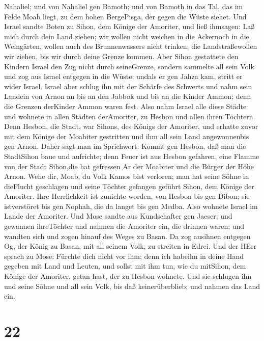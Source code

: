 Nahaliel; und von Nahaliel gen Bamoth;  und von Bamoth in
das Tal, das im Felde Moab liegt, zu dem hohen BergePisga, der gegen die
Wüste siehet.  Und Israel sandte Boten zu Sihon, dem Könige
der Amoriter, und ließ ihmsagen:  Laß mich durch dein Land
ziehen; wir wollen nicht weichen in die Ackernoch in die Weingärten,
wollen auch des Brunnenwassers nicht trinken; die Landstraßewollen wir
ziehen, bis wir durch deine Grenze kommen.  Aber Sihon
gestattete den Kindern Israel den Zug nicht durch seineGrenze, sondern
sammelte all sein Volk und zog aus Israel entgegen in die Wüste; undals
er gen Jahza kam, stritt er wider Israel.  Israel aber
schlug ihn mit der Schärfe des Schwerts und nahm sein Landein von Arnon
an bis an den Jabbok und bis an die Kinder Ammon; denn die Grenzen
derKinder Ammon waren fest.  Also nahm Israel alle diese
Städte und wohnete in allen Städten derAmoriter, zu Hesbon und allen
ihren Töchtern.  Denn Hesbon, die Stadt, war Sihons, des
Königs der Amoriter, und erhatte zuvor mit dem Könige der Moabiter
gestritten und ihm all sein Land angewonnenbis gen Arnon. 
Daher sagt man im Sprichwort: Kommt gen Hesbon, daß man die StadtSihon
baue und aufrichte;  denn Feuer ist aus Hesbon gefahren,
eine Flamme von der Stadt Sihon,die hat gefressen Ar der Moabiter und
die Bürger der Höhe Arnon.  Wehe dir, Moab, du Volk Kamos
bist verloren; man hat seine Söhne in dieFlucht geschlagen und seine
Töchter gefangen geführt Sihon, dem Könige der Amoriter. 
Ihre Herrlichkeit ist zunichte worden, von Hesbon bis gen Dibon; sie
istverstöret bis gen Nophah, die da langet bis gen Medba. 
Also wohnete Israel im Lande der Amoriter.  Und Mose sandte
aus Kundschafter gen Jaeser; und gewannen ihreTöchter und nahmen die
Amoriter ein, die drinnen waren;  und wandten sich und
zogen hinauf des Weges zu Basan. Da zog ausihnen entgegen Og, der König
zu Basan, mit all seinem Volk, zu streiten in Edrei.  Und
der HErr sprach zu Mose: Fürchte dich nicht vor ihm; denn ich habeihn in
deine Hand gegeben mit Land und Leuten, und sollst mit ihm tun, wie du
mitSihon, dem Könige der Amoriter, getan hast, der zu Hesbon wohnete.
 Und sie schlugen ihn und seine Söhne und all sein Volk,
bis daß keinerüberblieb; und nahmen das Land ein.

\hypertarget{section-21}{%
\section{22}\label{section-21}}

